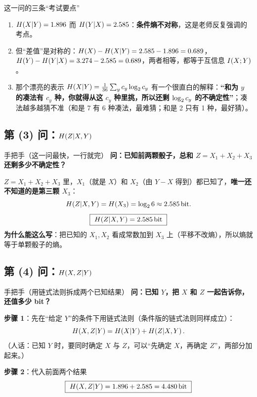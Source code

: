 \documentclass[11pt,a4paper]{ctexart}
\begin{document}
\begin{idea}{这一问的三条“考试要点”}
\begin{enumerate}[leftmargin=1.6em,itemsep=1pt,topsep=2pt]
  \item $H\!\left(X|Y\right)=1.896$ 而 $H\!\left(Y|X\right)=2.585$：\textbf{条件熵不对称}，这是老师反复强调的考点。
  \item 但“差值”是对称的：$H\!\left(X\right)-H\!\left(X|Y\right)=2.585-1.896=0.689$，$H\!\left(Y\right)-H\!\left(Y|X\right)=3.274-2.585=0.689$，两者相等，都等于互信息 $I\!\left(X;Y\right)$。
  \item 那个漂亮的表示 $H\!\left(X|Y\right)=\frac1{36}\sum_y c_y\log_{2} c_y$ 有一个很直白的解释：\textbf{“和为 $y$ 的凑法有 $c_y$ 种，你就得从这 $c_y$ 种里挑，所以还剩 $\log_{2} c_y$ 的不确定性”}；凑法越多越猜不准（和是 7 有 6 种凑法，最难猜；和是 2 只有 1 种，最好猜）。
\end{enumerate}
\end{idea}

\subsection{第 (3) 问：$H\!\left(Z|X,Y\right)$}

\begin{calc}{手把手（这一问最快，一行就完）}
\textbf{问：已知前两颗骰子，总和 $Z=X_1+X_2+X_3$ 还剩多少不确定性？}

$Z=X_1+X_2+X_3$ 里，$X_1$（就是 $X$）和 $X_2$（由 $Y-X$ 得到）都已知了，\textbf{唯一还不知道的是第三颗 $X_3$}：
\[
H\!\left(Z|X,Y\right)=H\!\left(X_3\right)=\log_{2}6\approx2.585\,\text{bit} .
\]
\[
\boxed{\ \Hx{Z|X,Y}=2.585\bit\ }
\]
\textbf{为什么能这么写}：把已知的 $X_1,X_2$ 看成常数加到 $X_3$ 上（平移不改熵），所以熵就等于单颗骰子的熵。
\end{calc}

\subsection{第 (4) 问：$H\!\left(X,Z|Y\right)$}

\begin{calc}{手把手（用链式法则拆成两个已知结果）}
\textbf{问：已知 $Y$，把 $X$ 和 $Z$ 一起告诉你，还值多少 bit？}

\textbf{步骤 1}：先在“给定 $Y$”的条件下用链式法则（条件版的链式法则同样成立）：
\[
H\!\left(X,Z|Y\right)=H\!\left(X|Y\right)+H\!\left(Z|X,Y\right) .
\]
（人话：已知 $Y$ 时，要同时确定 $X$ 与 $Z$，可以“先确定 $X$，再确定 $Z$”，两部分加起来。）

\textbf{步骤 2}：代入前面两个结果
\[
\boxed{\ \Hx{X,Z|Y}=1.896+2.585=4.480\bit\ }
\]
\end{calc}
\end{document}
